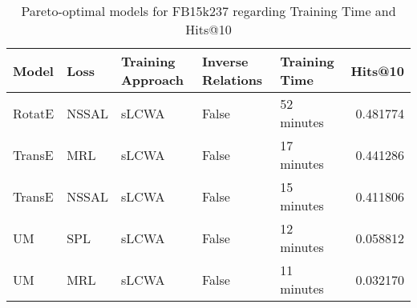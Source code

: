 \begin{table}
\centering
\caption{Pareto-optimal models for FB15k237 regarding Training Time and Hits@10}
\begin{tabular}{lllllr}
\toprule
  Model &   Loss & Training Approach & Inverse Relations & Training Time &   Hits@10 \\
\midrule
 RotatE &  NSSAL &             sLCWA &             False &    52 minutes &  0.481774 \\
 TransE &    MRL &             sLCWA &             False &    17 minutes &  0.441286 \\
 TransE &  NSSAL &             sLCWA &             False &    15 minutes &  0.411806 \\
     UM &    SPL &             sLCWA &             False &    12 minutes &  0.058812 \\
     UM &    MRL &             sLCWA &             False &    11 minutes &  0.032170 \\
\bottomrule
\end{tabular}
\end{table}

